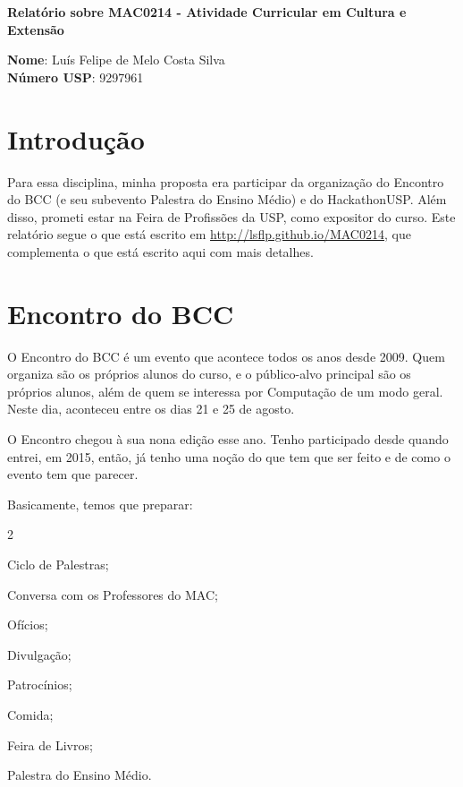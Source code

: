 \documentclass[12pt,letterpaper]{article}
\begin{document}
	\begin{center}
		\Large \bf
		Relatório sobre MAC0214 - Atividade Curricular em Cultura e Extensão
	\end{center}
	
	\textbf{Nome}: Luís Felipe de Melo Costa Silva \\
	\textbf{Número USP}: 9297961
	
	\section*{Introdução}
	Para essa disciplina, minha proposta era participar da organização do Encontro do BCC (e seu subevento Palestra do Ensino Médio) e do HackathonUSP. Além disso, prometi estar na Feira de Profissões da USP, como expositor do curso. Este relatório segue o que está escrito em \url{http://lsflp.github.io/MAC0214}, que complementa o que está escrito aqui com mais detalhes.
	
	\section{Encontro do BCC}
	O Encontro do BCC é um evento que acontece todos os anos desde 2009. Quem organiza são os próprios alunos do curso, e o público-alvo principal são os próprios alunos, além de quem se interessa por Computação de um modo geral. Neste dia, aconteceu entre os dias 21 e 25 de agosto.
	
	O Encontro chegou à sua nona edição esse ano. Tenho participado desde quando entrei, em 2015, então, já tenho uma noção do que tem que ser feito e de como o evento tem que parecer. 
	
	Basicamente, temos que preparar:
	
	\begin{itemize}
	\end{itemize}
\end{document}

